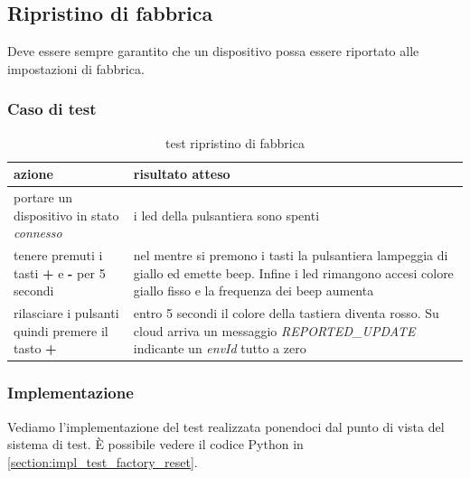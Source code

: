 \documentclass[12pt,a4paper,twoside,titlepage]{book}
\begin{document}
\subsection{Ripristino di fabbrica}
\label{section:test_factory_reset}

Deve essere sempre garantito che un dispositivo possa essere riportato alle impostazioni di fabbrica.

\subsubsection{Caso di test}

\begin{table}
    \centering
    \begin{tabular}{| p{} | p{} |}
        \hline \textbf{azione} & \textbf{risultato atteso} \\
        \hline portare un dispositivo in stato \textit{connesso} & i \acrshort{led} della pulsantiera sono spenti \\
        \hline tenere premuti i tasti \textbf{+} e \textbf{-} per 5 secondi & nel mentre si premono i tasti la pulsantiera lampeggia di giallo ed emette beep. Infine i \acrshort{led} rimangono accesi colore giallo fisso e la frequenza dei beep aumenta \\
        \hline rilasciare i pulsanti quindi premere il tasto \textbf{+} & entro 5 secondi il colore della tastiera diventa rosso. Su cloud arriva un messaggio \textit{REPORTED\_UPDATE} indicante un \textit{envId} tutto a zero \\
        \hline
    \end{tabular}
    \caption{test ripristino di fabbrica}
\end{table}

\subsubsection{Implementazione}
Vediamo l'implementazione del test realizzata ponendoci dal punto di vista del sistema di test. 
È possibile vedere il codice Python in \autoref{section:impl_test_factory_reset}.
\end{document}
